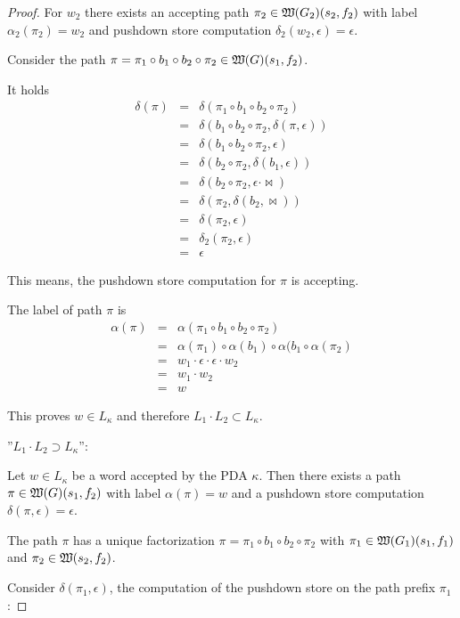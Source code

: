 \begin{proof}
For $w_2$ there exists an accepting path $\pi_2 \in \mbox{$\mathfrak{W}({G_2})$}(s_2,
f_2)$ with label $\alpha_2(\pi_2) = w_2$ and pushdown store computation
$\delta_2(w_2, \epsilon) = \epsilon$.

Consider the path $\pi = \pi_1 \circ b_1 \circ b_2 \circ \pi_2 \in
\mbox{$\mathfrak{W}({G})$}(s_1, f_2)$.

It holds
\begin{eqnarray*}
\delta(\pi) &=& \delta(\pi_1 \circ b_1 \circ b_2 \circ \pi_2) \\
&=& \delta(b_1 \circ b_2 \circ \pi_2, \delta(\pi, \epsilon)) \\
&=& \delta(b_1 \circ b_2 \circ \pi_2, \epsilon) \\
&=& \delta(b_2 \circ \pi_2, \delta(b_1, \epsilon)) \\
&=& \delta(b_2 \circ \pi_2, \epsilon \cdot \Join) \\
&=& \delta(\pi_2, \delta(b_2, \Join)) \\
&=& \delta(\pi_2, \epsilon) \\
&=& \delta_2(\pi_2, \epsilon) \\
&=& \epsilon
\end{eqnarray*}

This means, the pushdown store computation for $\pi$ is accepting.

The label of path $\pi$ is
\begin{eqnarray*}
\alpha(\pi) &=& \alpha(\pi_1 \circ b_1 \circ b_2 \circ \pi_2) \\
&=& \alpha(\pi_1) \circ \alpha(b_1) \circ \alpha(b_1 \circ \alpha(\pi_2) \\
&=& w_1 \cdot \epsilon \cdot \epsilon \cdot w_2 \\
&=& w_1 \cdot w_2 \\
&=& w
\end{eqnarray*}

This proves $w \in L_{\kappa}$ and therefore $L_1 \cdot L_2 \subset L_{\kappa}$.

''$L_1 \cdot L_2 \supset L_{\kappa}$'':

Let $w \in L_{\kappa}$ be a word accepted by the PDA $\kappa$. Then there exists
a path $\pi \in \mbox{$\mathfrak{W}({G})$}(s_1, f_2)$ with label $\alpha(\pi) = w$ and a
pushdown store computation $\delta(\pi, \epsilon) = \epsilon$.

The path $\pi$ has a unique factorization $\pi = \pi_1 \circ b_1 \circ b_2
\circ \pi_2$ with $\pi_1 \in \mbox{$\mathfrak{W}({G_1})$}(s_1, f_1)$ and $\pi_2 \in
\mbox{$\mathfrak{W}({s_2, f_2})$}$. 

Consider $\delta(\pi_1, \epsilon)$, the computation of the pushdown store on the
path prefix $\pi_1$:


\end{proof}
